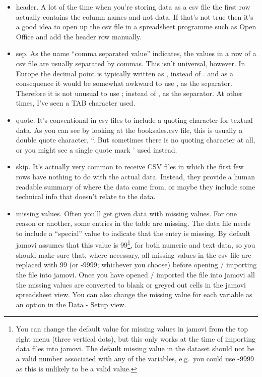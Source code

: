 \documentclass[
]{book}
\providecommand{\tightlist}{%
  \setlength{\itemsep}{0pt}\setlength{\parskip}{0pt}}
\begin{document}
\begin{itemize}
\tightlist
\item
  header. A lot of the time when you're storing data as a csv file the first row actually contains the column names and not data. If that's not true then it's a good idea to open up the csv file in a spreadsheet programme such as Open Office and add the header row manually.
\item
  sep. As the name ``comma separated value'' indicates, the values in a row of a csv file are usually separated by commas. This isn't universal, however. In Europe the decimal point is typically written as , instead of . and as a consequence it would be somewhat awkward to use , as the separator. Therefore it is not unusual to use ; instead of , as the separator. At other times, I've seen a TAB character used.
\item
  quote. It's conventional in csv files to include a quoting character for textual data. As you can see by looking at the booksales.csv file, this is usually a double quote character, ``. But sometimes there is no quoting character at all, or you might see a single quote mark ' used instead.
\item
  skip. It's actually very common to receive CSV files in which the first few rows have nothing to do with the actual data. Instead, they provide a human readable summary of where the data came from, or maybe they include some technical info that doesn't relate to the data.
\item
  missing values. Often you'll get given data with missing values. For one reason or another, some entries in the table are missing. The data file needs to include a ``special'' value to indicate that the entry is missing. By default jamovi assumes that this value is 99\footnote{You can change the default value for missing values in jamovi from the top right menu (three vertical dots), but this only works at the time of importing data files into jamovi. The default missing value in the dataset should not be a valid number associated with any of the variables, e.g.~you could use -9999 as this is unlikely to be a valid value.}, for both numeric and text data, so you should make sure that, where necessary, all missing values in the csv file are replaced with 99 (or -9999; whichever you choose) before opening / importing the file into jamovi. Once you have opened / imported the file into jamovi all the missing values are converted to blank or greyed out cells in the jamovi spreadsheet view. You can also change the missing value for each variable as an option in the Data - Setup view.
\end{itemize}
\end{document}
